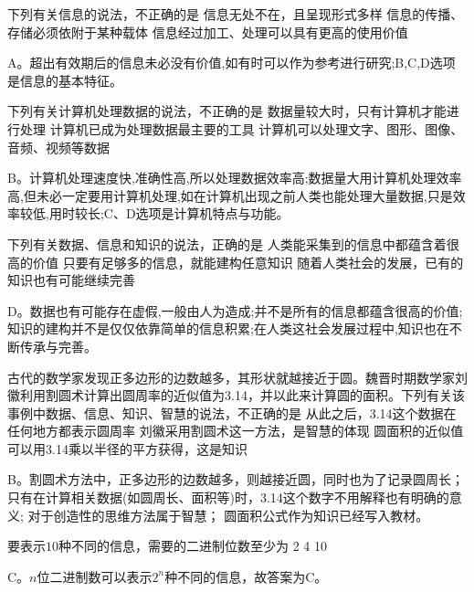 \begin{groups}
\begin{questions}[rp]
\question
{}下列有关信息的说法，不正确的是
{信息无处不在，且呈现形式多样}
{信息的传播、存储必须依附于某种载体}
{信息经过加工、处理可以具有更高的使用价值}
\begin{solution}
A。超出有效期后的信息未必没有价值,如有时可以作为参考进行研究;B,C,D选项是信息的基本特征。
\end{solution}

\question
{}下列有关计算机处理数据的说法，不正确的是
{数据量较大时，只有计算机才能进行处理}
{计算机已成为处理数据最主要的工具}
{计算机可以处理文字、图形、图像、音频、视频等数据}
\begin{solution}
B。计算机处理速度快,准确性高,所以处理数据效率高;数据量大用计算机处理效率高,但未必一定要用计算机处理,如在计算机出现之前人类也能处理大量数据,只是效率较低,用时较长;C、D选项是计算机特点与功能。
\end{solution}

\question
{}下列有关数据、信息和知识的说法，正确的是
{人类能采集到的信息中都蕴含着很高的价值}
{只要有足够多的信息，就能建构任意知识}
{随着人类社会的发展，已有的知识也有可能继续完善}
\begin{solution}
D。数据也有可能存在虚假,一般由人为造成;并不是所有的信息都蕴含很高的价值;知识的建构并不是仅仅依靠简单的信息积累;在人类这社会发展过程中,知识也在不断传承与完善。
\end{solution}

\question
{}古代的数学家发现正多边形的边数越多，其形状就越接近于圆。魏晋时期数学家刘徽利用割圆术计算出圆周率的近似值为3.14，并以此来计算圆的面积。下列有关该事例中数据、信息、知识、智慧的说法，不正确的是
{从此之后，3.14这个数据在任何地方都表示圆周率}
{刘徽采用割圆术这一方法，是智慧的体现}
{圆面积的近似值可以用3.14乘以半径的平方获得，这是知识}
\begin{solution}
B。割圆术方法中，正多边形的边数越多，则越接近圆，同时也为了记录圆周长；
只有在计算相关数据(如圆周长、面积等)时，3.14这个数字不用解释也有明确的意义;
对于创造性的思维方法属于智慧；
圆面积公式作为知识已经写入教材。
\end{solution}

\question
{}要表示$10$种不同的信息，需要的二进制位数至少为
{2}
{4}
{10}
\begin{solution}
C。$n$位二进制数可以表示$2^n$种不同的信息，故答案为C。
\end{solution}


\end{questions}
\end{groups}
